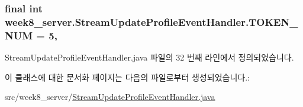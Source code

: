 \hypertarget{classweek8__server_1_1_stream_update_profile_event_handler_a23249215f663a5224287bb8e0c9d0588}{
\subsubsection[{T\-O\-K\-E\-N\-\_\-\-N\-U\-M}]{\setlength{\rightskip}{0pt plus 5cm}final int week8\-\_\-server.\-Stream\-Update\-Profile\-Event\-Handler.\-T\-O\-K\-E\-N\-\_\-\-N\-U\-M = 5\hspace{0.3cm}{\ttfamily [static]}, {\ttfamily [private]}}}\label{classweek8__server_1_1_stream_update_profile_event_handler_a23249215f663a5224287bb8e0c9d0588}


Stream\-Update\-Profile\-Event\-Handler.\-java 파일의 32 번째 라인에서 정의되었습니다.



이 클래스에 대한 문서화 페이지는 다음의 파일로부터 생성되었습니다.\-:\begin{DoxyCompactItemize}
\item 
src/week8\-\_\-server/\hyperlink{_stream_update_profile_event_handler_8java}{Stream\-Update\-Profile\-Event\-Handler.\-java}\end{DoxyCompactItemize}
